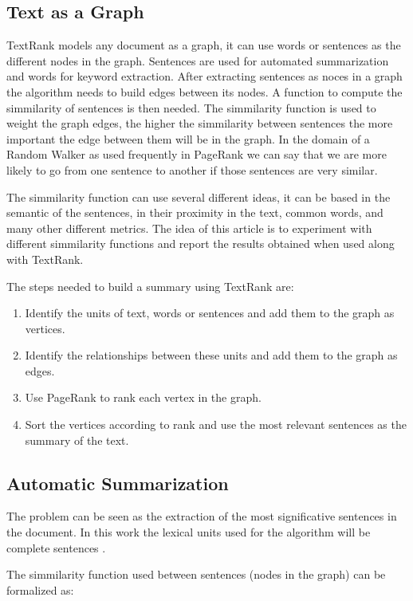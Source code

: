 \documentclass{llncs}
\begin{document}
\subsection{Text as a Graph}
TextRank models any document as a graph, it can use words or sentences as the different nodes in the graph. Sentences are used for automated summarization and words for keyword extraction. After extracting sentences as noces in a graph the algorithm needs to build edges between its nodes. A function to compute the simmilarity of sentences is then needed. The simmilarity function is used to weight the graph edges, the higher the simmilarity between sentences the more important the edge between them will be in the graph. In the domain of a Random Walker as used frequently in PageRank we can say that we are more likely to go from one sentence to another if those sentences are very similar. 

The simmilarity function can use several different ideas, it can be based in the semantic of the sentences, in their proximity in the text, common words, and many other different metrics. The idea of this article is to experiment with different simmilarity functions and report the results obtained when used along with TextRank.

The steps needed to build a summary using TextRank are:

\begin{enumerate}
\item Identify the units of text, words or sentences and add them to the graph as vertices.
\item Identify the relationships between these units and add them to the graph as edges. 
\item Use PageRank to rank each vertex in the graph.
\item Sort the vertices according to rank and use the most relevant sentences as the summary of the text.
\end{enumerate}

\subsection{Automatic Summarization}
The problem can be seen as the extraction of the most significative sentences in the document. In this work the lexical units used for the algorithm will be complete sentences \cite{introductionir}.

The simmilarity function used between sentences (nodes in the graph) can be formalized as:
\end{document}
